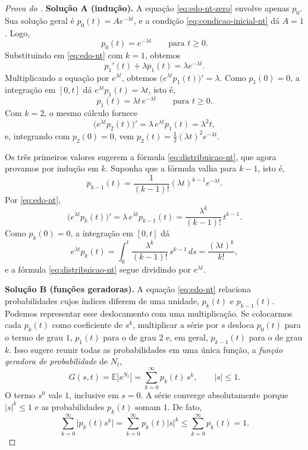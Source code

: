 \documentclass[12pt,portuguese]{article}
\theoremstyle{definition}
\theoremstyle{plainexercise}
\theoremstyle{starredexercise}
\theoremstyle{definition}
\begin{document}
\begin{proof}[Prova do ]
\medskip
\noindent\textbf{Solução A (indução).}
A equação \eqref{eq:edo-nt-zero} envolve apenas $p_0$. Sua solução geral é
$p_0(t)=Ae^{-\lambda t}$, e a condição \eqref{eq:condicao-inicial-nt} dá
$A=1$. Logo,
\[
  p_0(t)=e^{-\lambda t}\qquad\text{para } t\geqslant0.
\]
Substituindo em \eqref{eq:edo-nt} com $k=1$, obtemos
\[
  p_1'(t)+\lambda p_1(t)=\lambda e^{-\lambda t}.
\]
Multiplicando a equação por $e^{\lambda t}$, obtemos
$\bigl(e^{\lambda t}p_1(t)\bigr)'=\lambda$. Como $p_1(0)=0$, a integração em
$[0,t]$ dá $e^{\lambda t}p_1(t)=\lambda t$, isto é,
\[
  p_1(t)=\lambda t\,e^{-\lambda t}\qquad\text{para } t\geqslant0.
\]
Com $k=2$, o mesmo cálculo fornece
\[
  \bigl(e^{\lambda t}p_2(t)\bigr)'=\lambda\,e^{\lambda t}p_1(t)=\lambda^2t,
\]
e, integrando com $p_2(0)=0$, vem
$p_2(t)=\tfrac{1}{2}(\lambda t)^2e^{-\lambda t}$.

Os três primeiros valores sugerem a fórmula \eqref{eq:distribuicao-nt}, que
agora provamos por indução em $k$. Suponha que a fórmula valha para $k-1$,
isto é,
\[
  p_{k-1}(t)=\frac{1}{(k-1)!}(\lambda t)^{k-1}e^{-\lambda t}.
\]
Por \eqref{eq:edo-nt},
\[
  \bigl(e^{\lambda t}p_k(t)\bigr)'
  =\lambda\,e^{\lambda t}p_{k-1}(t)
  =\frac{\lambda^k}{(k-1)!}\,t^{k-1}.
\]
Como $p_k(0)=0$, a integração em $[0,t]$ dá
\[
  e^{\lambda t}p_k(t)
  =\int_0^t\frac{\lambda^k}{(k-1)!}\,s^{k-1}\,ds
  =\frac{(\lambda t)^k}{k!},
\]
e a fórmula \eqref{eq:distribuicao-nt} segue dividindo por $e^{\lambda t}$.

\medskip
\noindent\textbf{Solução B (funções geradoras).}
A equação \eqref{eq:edo-nt} relaciona probabilidades cujos índices diferem de
uma unidade, $p_k(t)$ e $p_{k-1}(t)$. Podemos representar esse deslocamento
com uma multiplicação. Se colocarmos cada $p_k(t)$ como coeficiente de $s^k$,
multiplicar a série por $s$ desloca $p_0(t)$ para o termo de grau $1$,
$p_1(t)$ para o de grau $2$ e, em geral, $p_{k-1}(t)$ para o de grau $k$.
Isso sugere reunir todas as probabilidades em uma única função,
a \emph{função geradora de probabilidade} de $N_t$,
\[
  G(s,t)=\mathbb{E}\bigl[s^{N_t}\bigr]=\sum_{k=0}^{\infty}p_k(t)\,s^k,
  \qquad |s|\leqslant1.
\]
O termo $s^0$ vale $1$, inclusive em $s=0$. A série converge absolutamente
porque $|s|^k\leqslant1$ e as probabilidades $p_k(t)$ somam $1$. De fato,
\[
  \sum_{k=0}^{\infty}\bigl|p_k(t)s^k\bigr|
  =\sum_{k=0}^{\infty}p_k(t)|s|^k
  \leqslant\sum_{k=0}^{\infty}p_k(t)=1.
\]


\end{proof}
\end{document}
